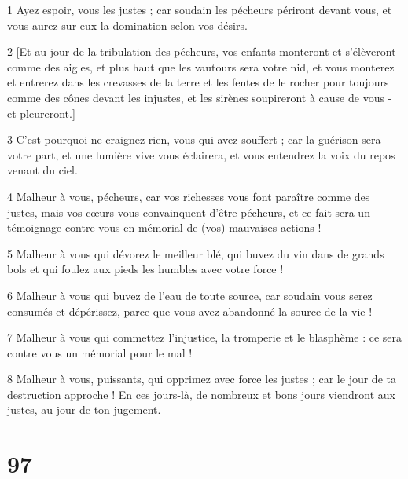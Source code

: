 \par 1 Ayez espoir, vous les justes ; car soudain les pécheurs périront devant vous, et vous aurez sur eux la domination selon vos désirs.
\par 2 [Et au jour de la tribulation des pécheurs, vos enfants monteront et s'élèveront comme des aigles, et plus haut que les vautours sera votre nid, et vous monterez et entrerez dans les crevasses de la terre et les fentes de le rocher pour toujours comme des cônes devant les injustes, et les sirènes soupireront à cause de vous - et pleureront.]
\par 3 C'est pourquoi ne craignez rien, vous qui avez souffert ; car la guérison sera votre part, et une lumière vive vous éclairera, et vous entendrez la voix du repos venant du ciel.
\par 4 Malheur à vous, pécheurs, car vos richesses vous font paraître comme des justes, mais vos cœurs vous convainquent d'être pécheurs, et ce fait sera un témoignage contre vous en mémorial de (vos) mauvaises actions !
\par 5 Malheur à vous qui dévorez le meilleur blé, qui buvez du vin dans de grands bols et qui foulez aux pieds les humbles avec votre force !
\par 6 Malheur à vous qui buvez de l'eau de toute source, car soudain vous serez consumés et dépérissez, parce que vous avez abandonné la source de la vie !
\par 7 Malheur à vous qui commettez l'injustice, la tromperie et le blasphème : ce sera contre vous un mémorial pour le mal !
\par 8 Malheur à vous, puissants, qui opprimez avec force les justes ; car le jour de ta destruction approche ! En ces jours-là, de nombreux et bons jours viendront aux justes, au jour de ton jugement.

\chapter{97}

